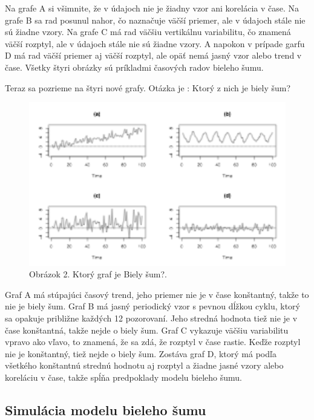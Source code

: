 \documentclass[
  letterpaper,
  DIV=11,
  numbers=noendperiod]{scrreprt}
\begin{document}
Na grafe A si všimnite, že v údajoch nie je žiadny vzor ani korelácia v
čase. Na grafe B sa rad posunul nahor, čo naznačuje väčší priemer, ale v
údajoch stále nie sú žiadne vzory. Na grafe C má rad väčšiu vertikálnu
variabilitu, čo znamená väčší rozptyl, ale v údajoch stále nie sú žiadne
vzory. A napokon v prípade garfu D má rad väčší priemer aj väčší
rozptyl, ale opäť nemá jasný vzor alebo trend v čase. Všetky štyri
obrázky sú príkladmi časových radov bieleho šumu.

Teraz sa pozrieme na štyri nové grafy. Otázka je : Ktorý z nich je biely
šum?

\begin{figure}[H]

{\centering \includegraphics{wn2.png}

}

\caption{Obrázok 2. Ktorý graf je Biely šum?.}

\end{figure}%

Graf A má stúpajúci časový trend, jeho priemer nie je v čase konštantný,
takže to nie je biely šum. Graf B má jasný periodický vzor s pevnou
dĺžkou cyklu, ktorý sa opakuje približne každých 12 pozorovaní. Jeho
stredná hodnota tiež nie je v čase konštantná, takže nejde o biely šum.
Graf C vykazuje väčšiu variabilitu vpravo ako vľavo, to znamená, že sa
zdá, že rozptyl v čase rastie. Keďže rozptyl nie je konštantný, tiež
nejde o biely šum. Zostáva graf D, ktorý má podľa všetkého konštantnú
strednú hodnotu aj rozptyl a žiadne jasné vzory alebo koreláciu v čase,
takže spĺňa predpoklady modelu bieleho šumu.

\subsection{Simulácia modelu bieleho
šumu}\label{simuluxe1cia-modelu-bieleho-ux161umu}
\end{document}
